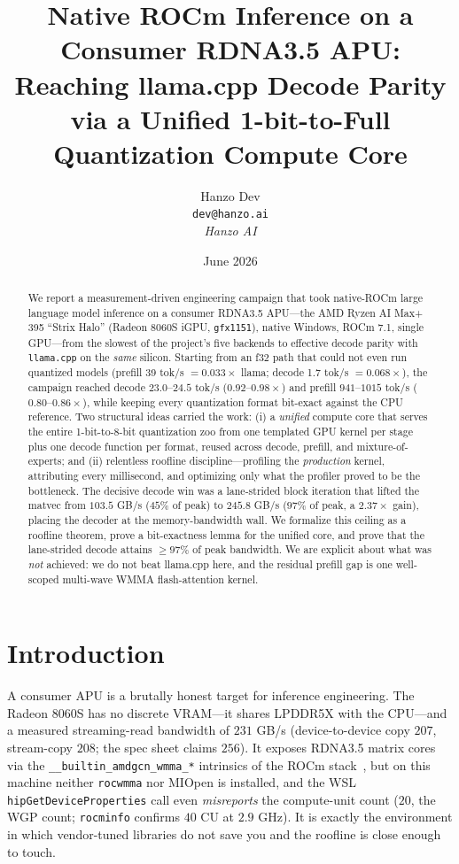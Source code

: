\documentclass[11pt]{article}
\title{Native ROCm Inference on a Consumer RDNA3.5 APU: Reaching llama.cpp Decode Parity via a Unified 1-bit-to-Full Quantization Compute Core}
\author{Hanzo Dev \\ \texttt{dev@hanzo.ai} \\ \textit{Hanzo AI}}
\date{June 2026}
\begin{document}
\hanzocoverpage

\begin{abstract}
We report a measurement-driven engineering campaign that took native-ROCm large language model inference on a consumer RDNA3.5 APU---the AMD Ryzen AI Max+ 395 ``Strix Halo'' (Radeon 8060S iGPU, \texttt{gfx1151}), native Windows, ROCm 7.1, single GPU---from the slowest of the project's five backends to effective decode parity with \texttt{llama.cpp} on the \emph{same} silicon. Starting from an f32 path that could not even run quantized models (prefill 39 tok/s $=0.033\times$ llama; decode 1.7 tok/s $=0.068\times$), the campaign reached decode $23.0$--$24.5$ tok/s ($0.92$--$0.98\times$) and prefill $941$--$1015$ tok/s ($0.80$--$0.86\times$), while keeping every quantization format bit-exact against the CPU reference. Two structural ideas carried the work: (i) a \emph{unified} compute core that serves the entire 1-bit-to-8-bit quantization zoo from one templated GPU kernel per stage plus one decode function per format, reused across decode, prefill, and mixture-of-experts; and (ii) relentless roofline discipline---profiling the \emph{production} kernel, attributing every millisecond, and optimizing only what the profiler proved to be the bottleneck. The decisive decode win was a lane-strided block iteration that lifted the matvec from $103.5$ GB/s ($45\%$ of peak) to $245.8$ GB/s ($97\%$ of peak, a $2.37\times$ gain), placing the decoder at the memory-bandwidth wall. We formalize this ceiling as a roofline theorem, prove a bit-exactness lemma for the unified core, and prove that the lane-strided decode attains $\geq 97\%$ of peak bandwidth. We are explicit about what was \emph{not} achieved: we do not beat llama.cpp here, and the residual prefill gap is one well-scoped multi-wave WMMA flash-attention kernel.
\end{abstract}

\section{Introduction}

A consumer APU is a brutally honest target for inference engineering. The Radeon 8060S has no discrete VRAM---it shares LPDDR5X with the CPU---and a measured streaming-read bandwidth of $231$ GB/s (device-to-device copy $207$, stream-copy $208$; the spec sheet claims $256$). It exposes RDNA3.5 matrix cores via the \texttt{\_\_builtin\_amdgcn\_wmma\_*} intrinsics of the ROCm stack~\cite{rocm2024}, but on this machine neither \texttt{rocwmma} nor MIOpen is installed, and the WSL \texttt{hipGetDeviceProperties} call even \emph{misreports} the compute-unit count ($20$, the WGP count; \texttt{rocminfo} confirms $40$ CU at $2.9$ GHz). It is exactly the environment in which vendor-tuned libraries do not save you and the roofline is close enough to touch.
\end{document}
